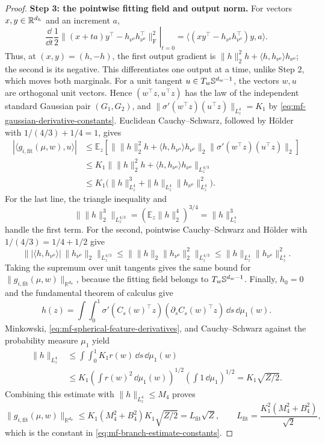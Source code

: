 \begin{proof}
\par\noindent\textbf{Step 3: the pointwise fitting field and output norm.}
For vectors \(x,y\in\mathbb{R}^{d_h}\) and an increment \(a\),
\[
 \left.\frac{\dd}{\dd t}\frac12
 \|(x+ta)y^\top-h_{\nu^o}h_{\nu^o}^\top\|_{\mathrm F}^2\right|_{t=0}
 =\langle (xy^\top-h_{\nu^o}h_{\nu^o}^\top)y,a\rangle.
\]
Thus, at \((x,y)=(h,-h)\), the first output gradient is
\(\|h\|_2^2h+\langle h,h_{\nu^o}\rangle h_{\nu^o}\); the second is
its negative. This differentiates one output at a time, unlike Step 2,
which moves both marginals.
For a unit tangent \(u\in T_w\mathbb{S}^{d_w-1}\), the vectors \(w,u\) are
orthogonal unit vectors.  Hence \((w^\top z,u^\top z)\) has the law of the
independent standard Gaussian pair \((G_1,G_2)\), and
\(\|\sigma'(w^\top z)(u^\top z)\|_{L^4_z}=K_1\) by
\cref{eq:mf-gaussian-derivative-constants}.  Euclidean Cauchy--Schwarz,
followed by H\"older with \(1/(4/3)+1/4=1\), gives
\[
\begin{aligned}
 |\langle g_{i,\mathrm{fit}}(\mu,w),u\rangle|
 &\le\mathbb E_z\!\left[
 \bigl\|\|h\|_2^2h+\langle h,h_{\nu^o}\rangle h_{\nu^o}\bigr\|_2
 \bigl\|\sigma'(w^\top z)(u^\top z)\bigr\|_2\right]\\
 &\le K_1\bigl\|\|h\|_2^2h
              +\langle h,h_{\nu^o}\rangle h_{\nu^o}\bigr\|_{L^{4/3}_z}\\
 &\le K_1\bigl(\|h\|_{L^4_z}^3
                     +\|h\|_{L^4_z}\|h_{\nu^o}\|_{L^4_z}^2\bigr).
\end{aligned}
\]
For the last line, the triangle inequality and
\[
 \|\|h\|_2^3\|_{L^{4/3}_z}
 =(\mathbb E_z\|h\|_2^4)^{3/4}=\|h\|_{L^4_z}^3
\]
handle the first term.  For the second, pointwise Cauchy--Schwarz and
H\"older with \(1/(4/3)=1/4+1/2\) give
\[
 \bigl\||\langle h,h_{\nu^o}\rangle|\,\|h_{\nu^o}\|_2
 \bigr\|_{L^{4/3}_z}
 \le\|\|h\|_2\|h_{\nu^o}\|_2^2\|_{L^{4/3}_z}
 \le\|h\|_{L^4_z}\|h_{\nu^o}\|_{L^4_z}^2.
\]
Taking the supremum over unit tangents gives the same bound for
\(\|g_{i,\mathrm{fit}}(\mu,w)\|_{\mathbb R^{d_w}}\), because the fitting
field belongs to \(T_w\mathbb{S}^{d_w-1}\).
Finally, \(h_0=0\) and the fundamental theorem of calculus give
\[
 h(z)=\int\int_0^1\sigma'(C_s(w)^\top z)
                      (\partial_sC_s(w)^\top z)\,\dd s\,\dd\mu_1(w).
\]
Minkowski, \cref{eq:mf-spherical-feature-derivatives}, and
Cauchy--Schwarz against the probability measure \(\mu_1\) yield
\[
\begin{aligned}
 \|h\|_{L^4_z}
 &\le\int\int_0^1 K_1 r(w)\,\dd s\,\dd\mu_1(w)\\
 &\le K_1\left(\int r(w)^2\,\dd\mu_1(w)\right)^{1/2}
          \left(\int1\,\dd\mu_1\right)^{1/2}
 =K_1\sqrt{Z/2}.
\end{aligned}
\]
Combining this estimate with \(\|h\|_{L^4_z}\le M_4\) proves
\[
 \|g_{i,\mathrm{fit}}(\mu,w)\|_{\mathbb R^{d_w}}
 \le K_1(M_4^2+B_4^2)K_1\sqrt{Z/2}
 =L_{\mathrm{fit}}\sqrt Z,
 \qquad L_{\mathrm{fit}}=\frac{K_1^2(M_4^2+B_4^2)}{\sqrt2},
\]
which is the constant in \cref{eq:mf-branch-estimate-constants}.
\end{proof}


